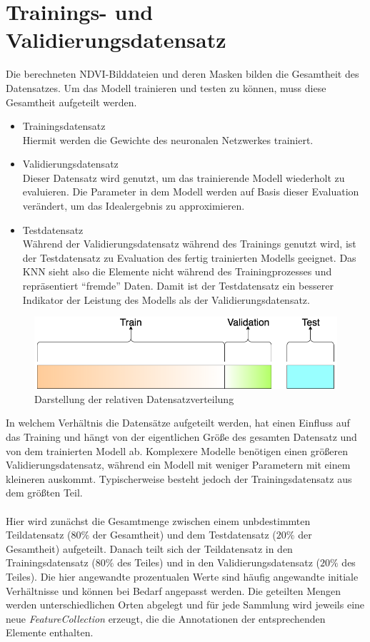 \section{Trainings- und Validierungsdatensatz}\label{sec:dataset}

Die berechneten NDVI-Bilddateien und deren Masken bilden die Gesamtheit des Datensatzes. Um das Modell trainieren und testen zu können, muss diese Gesamtheit aufgeteilt werden. 
\begin{itemize}
	\item Trainingsdatensatz \\
		Hiermit werden die Gewichte des neuronalen Netzwerkes trainiert.
	\item Validierungsdatensatz \\ 
		Dieser Datensatz wird genutzt, um das trainierende Modell wiederholt zu evaluieren. Die Parameter in dem Modell werden auf Basis dieser Evaluation verändert, um das Idealergebnis zu approximieren.
	\item Testdatensatz \\
		Während der Validierungsdatensatz während des Trainings genutzt wird, ist der Testdatensatz zu Evaluation des fertig trainierten Modells geeignet. Das KNN sieht also die Elemente nicht während des Trainingprozesses und repräsentiert "`fremde"' Daten. Damit ist der Testdatensatz ein besserer Indikator der Leistung des Modells als der Validierungsdatensatz.
\end{itemize}

\begin{figure}[ht]
  \centering
  \includegraphics[width=.9\textwidth]{pics/data-split.png}
  \caption[Datensatzverteilung]{Darstellung der relativen Datensatzverteilung\cite{ref:dataset}}
  \label{fig:split}
\end{figure}
\noindent
In welchem Verhältnis die Datensätze aufgeteilt werden, hat einen Einfluss auf das Training und hängt von der eigentlichen Größe des gesamten Datensatz und von dem trainierten Modell ab. Komplexere Modelle benötigen einen größeren Validierungsdatensatz, während ein Modell mit weniger Parametern mit einem kleineren auskommt.\cite{ref:dataset} Typischerweise besteht jedoch der Trainingsdatensatz aus dem größten Teil. 
\\\\
Hier wird zunächst die Gesamtmenge zwischen einem unbdestimmten Teildatensatz ($80\%$ der Gesamtheit) und dem Testdatensatz ($20\%$ der Gesamtheit) aufgeteilt. Danach teilt sich der Teildatensatz in den Trainingsdatensatz ($80\%$ des Teiles) und in den Validierungsdatensatz ($20\%$ des Teiles). Die hier angewandte prozentualen Werte sind häufig angewandte initiale Verhältnisse und können bei Bedarf angepasst werden. Die geteilten Mengen werden unterschiedlichen Orten abgelegt und für jede Sammlung wird jeweils eine neue \textit{FeatureCollection} erzeugt, die die Annotationen der entsprechenden Elemente enthalten. 

